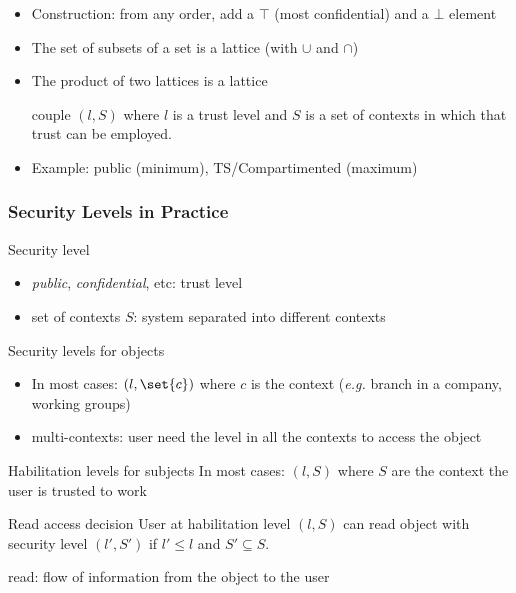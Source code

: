 \begin{reveals}
\begin{frame}
  \begin{itemize}
  \item Construction: from any order, add a \(\top\) (most
    confidential) and a \(\bot\) element
  \item The set of subsets of a set is a lattice (with \(\cup\) and \(\cap\))
  \item The product of two lattices is a lattice
    \begin{center}
      couple \((l,S)\) where \(l\) is a trust level and \(S\) is a set
      of contexts in which that trust can be employed.
    \end{center}
  \item Example: public (minimum), TS/Compartimented (maximum)
  \end{itemize}
\end{frame}

\begin{frame}
  \frametitle{Security Levels in Practice}
  
  \begin{block}{Security level}
    \begin{itemize}
    \item \textit{public}, \textit{confidential}, etc: trust level
    \item set of contexts \(S\): system separated into different contexts
    \end{itemize}
  \end{block}

  \begin{block}{Security levels for objects}
    \begin{itemize}
    \item In most cases: \((l,\set{c})\) where \(c\) is the context
      (\textit{e.g.} branch in a company, working groups)
    \item multi-contexts: user need the level in all the contexts to
      access the object
    \end{itemize}
  \end{block}

  
  \begin{block}{Habilitation levels for subjects}
    In most cases: \((l,S)\) where \(S\) are the context the user is
    trusted to work
  \end{block}

  \begin{block}{Read access decision}
    User at habilitation level \((l,S)\) can read object with security
    level \((l',S')\) if \(l'\le l\) and \(S'\subseteq S\).
    \begin{center}
      read: flow of information from the object to the user
    \end{center}
  \end{block}


\end{frame}
\end{reveals}
